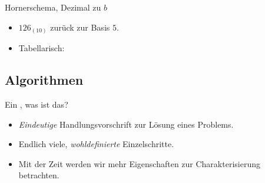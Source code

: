 \begin{frame}{Hornerschema, Dezimal zu \(b\)}
    \begin{itemize}[]
        \item \pause \(126_{(10)}\) zurück zur Basis \(5\).
        \item \pause Tabellarisch: 
    \end{itemize}
\end{frame}

\subsection{Algorithmen}
\begin{frame}{Ein , was ist das?}
    \begin{itemize}[<+(1)->]
        \itemsep13pt
        \item \emph{Eindeutige} Handlungsvorschrift zur Lösung eines Problems.
        \item Endlich viele, \emph{wohldefinierte}  Einzelschritte.
        \item Mit der Zeit werden wir mehr Eigenschaften zur Charakterisierung betrachten.%
    \end{itemize}
\end{frame}
